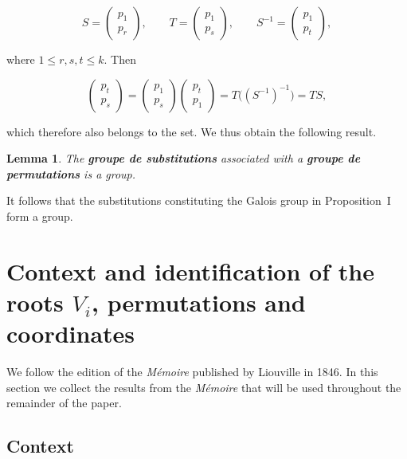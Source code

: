 \documentclass[a4paper,11pt]{article}
\newtheorem{lemma}{Lemma}
\begin{document}
\[
S=
\left(
\begin{array}{c}
	p_1\\
	p_r
\end{array}
\right),
\qquad
T=
\left(
\begin{array}{c}
	p_1\\
	p_s
\end{array}
\right),
\qquad
S^{-1}=
\left(
\begin{array}{c}
	p_1\\
	p_t
\end{array}
\right),
\]

where \(1\le r,s,t\le k\). Then

\[
\left(
\begin{array}{c}
	p_t\\
	p_s
\end{array}
\right)
=
\left(
\begin{array}{c}
	p_1\\
	p_s
\end{array}
\right)
\left(
\begin{array}{c}
	p_t\\
	p_1
\end{array}
\right)
=
T\bigl((S^{-1})^{-1}\bigr)
=
TS,
\]

which therefore also belongs to the set. We thus obtain the following result.

\begin{lemma}
	\label{lem:drie}
	The \textbf{\textit{groupe de substitutions}} associated with a \textbf{\textit{groupe de permutations}} is a group.
\end{lemma}

It follows that the substitutions constituting the Galois group in Proposition~I form a group.


\section{Context and identification of the roots \(V_i\), permutations and coordinates}
\label{sec:ct}

We follow the edition of the \textit{Mémoire} published by Liouville in 1846. In this section we collect the results from the \textit{Mémoire} that will be used throughout the remainder of the paper.

\subsection{Context}
\end{document}
